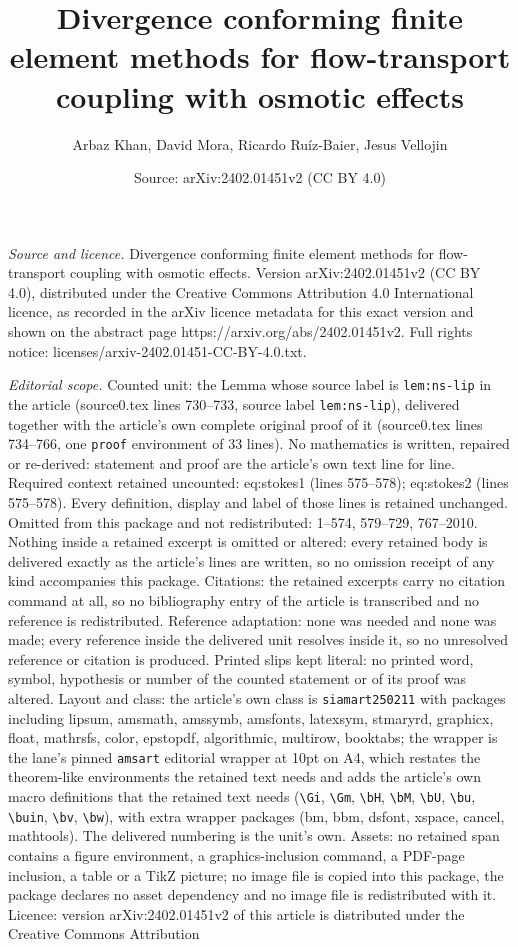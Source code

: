 \documentclass[10pt,a4paper]{amsart}
\title[Divergence conforming finite element methods for flow-transp]{Divergence conforming finite element methods for flow-transport coupling with osmotic effects}
\author{Arbaz Khan, David Mora, Ricardo Ru\'iz-Baier, Jesus Vellojin}
\date{Source: arXiv:2402.01451v2 (CC BY 4.0)}
\begin{document}
\maketitle

\noindent\emph{Source and licence.} Divergence conforming finite element methods for flow-transport coupling with osmotic effects. Version arXiv:2402.01451v2 (CC BY 4.0), distributed under the Creative Commons Attribution 4.0 International licence, as recorded in the arXiv licence metadata for this exact version and shown on the abstract page https://arxiv.org/abs/2402.01451v2. Full rights notice: licenses/arxiv-2402.01451-CC-BY-4.0.txt.\par\smallskip

\noindent\textit{Editorial scope.} Counted unit: the Lemma whose source label is \texttt{lem:ns-lip} in the article (source0.tex lines 730--733, source label \texttt{lem:ns-lip}), delivered together with the article's own complete original proof of it (source0.tex lines 734--766, one \texttt{proof} environment of 33 lines). No mathematics is written, repaired or re-derived: statement and proof are the article's own text line for line. Required context retained uncounted: eq:stokes1 (lines 575--578); eq:stokes2 (lines 575--578). Every definition, display and label of those lines is retained unchanged. Omitted from this package and not redistributed: 1--574, 579--729, 767--2010. Nothing inside a retained excerpt is omitted or altered: every retained body is delivered exactly as the article's lines are written, so no omission receipt of any kind accompanies this package. Citations: the retained excerpts carry no citation command at all, so no bibliography entry of the article is transcribed and no reference is redistributed. Reference adaptation: none was needed and none was made; every reference inside the delivered unit resolves inside it, so no unresolved reference or citation is produced. Printed slips kept literal: no printed word, symbol, hypothesis or number of the counted statement or of its proof was altered. Layout and class: the article's own class is \texttt{siamart250211} with packages including lipsum, amsmath, amssymb, amsfonts, latexsym, stmaryrd, graphicx, float, mathrsfs, color, epstopdf, algorithmic, multirow, booktabs; the wrapper is the lane's pinned \texttt{amsart} editorial wrapper at 10pt on A4, which restates the theorem-like environments the retained text needs and adds the article's own macro definitions that the retained text needs (\texttt{\textbackslash Gi}, \texttt{\textbackslash Gm}, \texttt{\textbackslash bH}, \texttt{\textbackslash bM}, \texttt{\textbackslash bU}, \texttt{\textbackslash bu}, \texttt{\textbackslash buin}, \texttt{\textbackslash bv}, \texttt{\textbackslash bw}), with extra wrapper packages (bm, bbm, dsfont, xspace, cancel, mathtools). The delivered numbering is the unit's own. Assets: no retained span contains a figure environment, a graphics-inclusion command, a PDF-page inclusion, a table or a TikZ picture; no image file is copied into this package, the package declares no asset dependency and no image file is redistributed with it. Licence: version arXiv:2402.01451v2 of this article is distributed under the Creative Commons Attribution 
\end{document}
